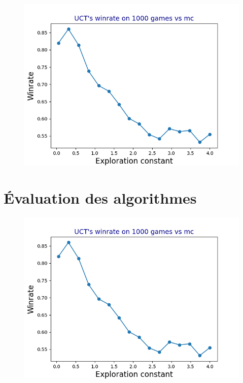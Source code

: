 \documentclass[a4paper]{article}
\theoremstyle{definition}
\begin{document}
\begin{figure}[h]
	\centering
	\includegraphics[scale=0.7]{test1.png}
	\caption{}
\end{figure}

\newpage

\section{Évaluation des algorithmes}

\begin{figure}[h]
\centering
\includegraphics[scale=0.7]{test1.png}
\caption{}
\end{figure}
\end{document}
